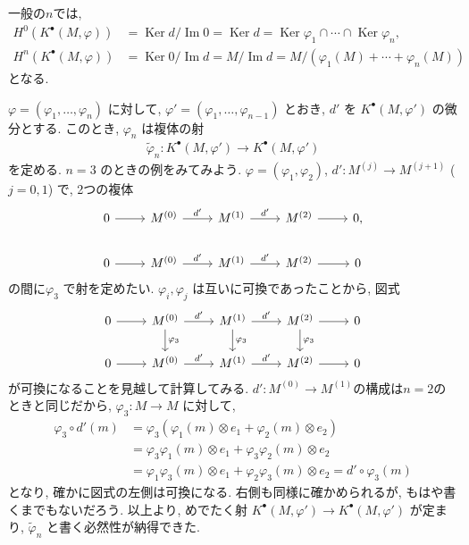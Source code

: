 \documentclass[11pt, a4paper, dvipdfmx]{jsarticle}
\theoremstyle{definition}
\newcommand{\Ker}{\mathop{\mathrm{Ker}}\nolimits}
\newcommand{\Img}{\mathop{\mathrm{Im}}\nolimits}
\newcommand{\pphi}{\varphi} %
\numberwithin{equation}{section}
\begin{document}
一般の$n$では, 
\begin{align*}
    H^0(K^\bullet(M,\pphi)) &= \Ker d / \Img0 
    = \Ker d = \Ker\pphi_1 \cap\cdots\cap \Ker\pphi_n, \\
    H^n(K^\bullet(M,\pphi)) &= \Ker 0/ \Img d = M/ \Img d
    = M/\left( \pphi_1(M)+\cdots+\pphi_n(M) \right)
\end{align*}
となる. 

$\pphi = (\pphi_1,\ldots,\pphi_n)$ に対して, 
$\pphi' = (\pphi_1,\ldots,\pphi_{n-1})$ とおき, 
$d'$ を $K^\bullet(M,\pphi')$ の微分とする. 
このとき, $\pphi_n$ は複体の射
\begin{align*}
    \widetilde{\pphi}_n:K^\bullet(M,\pphi')\to K^\bullet(M,\pphi')
\end{align*}
を定める. $n=3$ のときの例をみてみよう. 
$\pphi = (\pphi_1,\pphi_2)$, 
$d':M^{(j)}\to M^{(j+1)}$ ($j=0,1$) 
で, 2つの複体
\begin{equation*}
    \begin{tikzcd}
         0\arrow[left]{r}& M^{(0)} 
         \arrow[left]{r}{d'}& M^{(1)}
         \arrow[left]{r}{d'}& M^{(2)}\arrow[left]{r}&0, \\
         0\arrow[left]{r}& M^{(0)} 
         \arrow[left]{r}{d'}& M^{(1)}
         \arrow[left]{r}{d'}& M^{(2)}\arrow[left]{r}&0
    \end{tikzcd}
\end{equation*}
の間に$\pphi_3$ で射を定めたい. 
$\pphi_i,\pphi_j$ は互いに可換であったことから, 図式
\begin{equation*}
    \begin{tikzcd}
         0\arrow[left]{r}& M^{(0)} \arrow[left]{r}{d'}\arrow[left]{d}{\pphi_3}& M^{(1)} \arrow[left]{r}{d'}\arrow[left]{d}{\pphi_3}& M^{(2)}\arrow[left]{r}\arrow[left]{d}{\pphi_3}&0 \\
         0\arrow[left]{r}& M^{(0)} \arrow[left]{r}{d'}& M^{(1)} \arrow[left]{r}{d'}& M^{(2)}\arrow[left]{r}&0
    \end{tikzcd}
\end{equation*}
が可換になることを見越して計算してみる. 
$d':M^{(0)}\to M^{(1)}$の構成は$n=2$のときと同じだから, 
$\pphi_3:M\to M$ に対して, 
\begin{align*}
    \pphi_3\circ d'(m) 
    &= \pphi_3 \left( 
            \pphi_1(m)\otimes e_1 + \pphi_2(m)\otimes e_2 
       \right)\\
    &= \pphi_3\pphi_1(m)\otimes e_1 
    + \pphi_3\pphi_2(m)\otimes e_2 \\
    &= \pphi_1\pphi_3(m)\otimes e_1 
    + \pphi_2\pphi_3(m)\otimes e_2 
    = d'\circ\pphi_3(m)
\end{align*}
となり, 確かに図式の左側は可換になる. 
右側も同様に確かめられるが, もはや書くまでもないだろう. 
以上より, めでたく射
$K^\bullet(M,\pphi')\to K^\bullet(M,\pphi')$
が定まり, $\widetilde{\pphi}_n$ と書く必然性が納得できた. 
\end{document}
